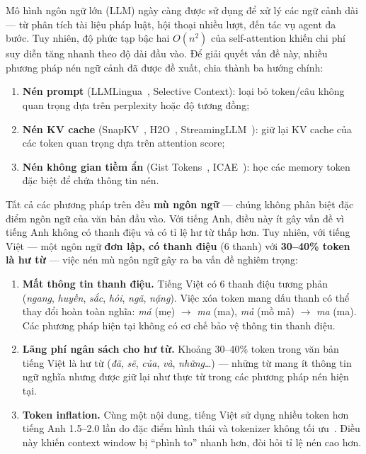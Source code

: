 \documentclass[12pt,a4paper]{article}
\newcommand{\tone}[1]{\textit{#1}}          %
\newcommand{\viet}[1]{\textit{#1}}           %
\begin{document}
Mô hình ngôn ngữ lớn (LLM) ngày càng được sử dụng để xử lý các ngữ cảnh dài --- từ phân tích tài liệu pháp luật, hội thoại nhiều lượt, đến tác vụ agent đa bước. Tuy nhiên, độ phức tạp bậc hai $O(n^2)$ của self-attention khiến chi phí suy diễn tăng nhanh theo độ dài đầu vào. Để giải quyết vấn đề này, nhiều phương pháp nén ngữ cảnh đã được đề xuất, chia thành ba hướng chính:

\begin{enumerate}[label=(\roman*)]
    \item \textbf{Nén prompt} (LLMLingua~\cite{jiang2023llmlingua}, Selective Context): loại bỏ token/câu không quan trọng dựa trên perplexity hoặc độ tương đồng;
    \item \textbf{Nén KV cache} (SnapKV~\cite{li2024snapkv}, H2O~\cite{zhang2023h2o}, StreamingLLM~\cite{xiao2024streamingllm}): giữ lại KV cache của các token quan trọng dựa trên attention score;
    \item \textbf{Nén không gian tiềm ẩn} (Gist Tokens~\cite{mu2023gist}, ICAE~\cite{ge2024icae}): học các memory token đặc biệt để chứa thông tin nén.
\end{enumerate}

Tất cả các phương pháp trên đều \textbf{mù ngôn ngữ} --- chúng không phân biệt đặc điểm ngôn ngữ của văn bản đầu vào. Với tiếng Anh, điều này ít gây vấn đề vì tiếng Anh không có thanh điệu và có tỉ lệ hư từ thấp hơn. Tuy nhiên, với tiếng Việt --- một ngôn ngữ \textbf{đơn lập, có thanh điệu} (6 thanh) với \textbf{30--40\% token là hư từ} --- việc nén mù ngôn ngữ gây ra ba vấn đề nghiêm trọng:

\begin{enumerate}[label=\textbf{P\arabic*}:,leftmargin=*]
    \item \textbf{Mất thông tin thanh điệu.} Tiếng Việt có 6 thanh điệu tương phản (\tone{ngang}, \tone{huyền}, \tone{sắc}, \tone{hỏi}, \tone{ngã}, \tone{nặng}). Việc xóa token mang dấu thanh có thể thay đổi hoàn toàn nghĩa: \viet{má} (mẹ) $\to$ \viet{ma} (ma), \viet{mả} (mồ mả) $\to$ \viet{ma} (ma). Các phương pháp hiện tại không có cơ chế bảo vệ thông tin thanh điệu.
    
    \item \textbf{Lãng phí ngân sách cho hư từ.} Khoảng 30--40\% token trong văn bản tiếng Việt là hư từ (\viet{đã}, \viet{sẽ}, \viet{của}, \viet{và}, \viet{những}\ldots) --- những từ mang ít thông tin ngữ nghĩa nhưng được giữ lại như thực từ trong các phương pháp nén hiện tại.
    
    \item \textbf{Token inflation.} Cùng một nội dung, tiếng Việt sử dụng nhiều token hơn tiếng Anh 1.5--2.0 lần do đặc điểm hình thái và tokenizer không tối ưu~\cite{lee2026equity, deng2026language}. Điều này khiến context window bị ``phình to'' nhanh hơn, đòi hỏi tỉ lệ nén cao hơn.
\end{enumerate}
\end{document}

